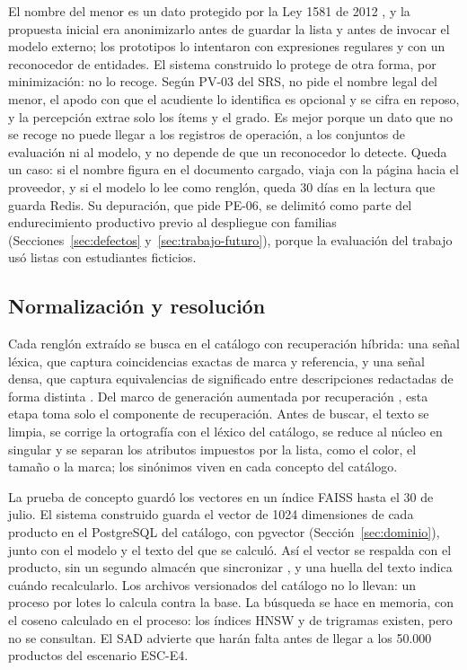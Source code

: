 El nombre del menor es un dato
protegido por la Ley 1581 de 2012 \citep{congreso_ley1581_2012}, y la propuesta inicial era
anonimizarlo antes de guardar la lista y antes de invocar el modelo externo; los prototipos lo
intentaron con expresiones regulares y con un reconocedor de entidades. El sistema construido lo
protege de otra forma, por minimización: no lo recoge. Según PV-03 del SRS, no pide el nombre legal del menor, el
apodo con que el acudiente lo identifica es opcional y se cifra en reposo, y la percepción extrae
solo los ítems y el grado. Es mejor porque un dato que no se recoge no puede llegar a los registros
de operación, a los conjuntos de evaluación ni al modelo, y no depende de que un reconocedor lo
detecte. Queda un caso: si el nombre figura en el documento cargado, viaja con la página hacia el
proveedor, y si el modelo lo lee como renglón, queda 30 días en la lectura que guarda Redis. Su
depuración, que pide PE-06, se delimitó como parte del endurecimiento productivo previo al
despliegue con familias (Secciones~\ref{sec:defectos} y~\ref{sec:trabajo-futuro}), porque la
evaluación del trabajo usó listas con estudiantes ficticios.

\subsection{Normalización y resolución}
\label{sec:normalizacion}

Cada renglón extraído se busca en el catálogo con recuperación híbrida: una señal léxica, que
captura coincidencias exactas de marca y referencia, y una señal densa, que captura equivalencias de
significado entre descripciones redactadas de forma distinta
\citep{reimers_sentence-bert_2019,karpukhin_dense_2020}. Del marco de generación aumentada por
recuperación \citep{lewis_retrieval-augmented_2020}, esta etapa toma solo el componente de
recuperación. Antes de buscar, el texto se limpia, se
corrige la ortografía con el léxico del catálogo, se reduce al núcleo en singular y se separan los
atributos impuestos por la lista, como el color, el tamaño o la marca; los sinónimos viven en cada
concepto del catálogo.

La
prueba de concepto guardó los vectores en un índice FAISS \citep{johnson_billion-scale_2021} hasta
el 30 de julio. El sistema construido guarda el vector de 1024 dimensiones de cada producto en el
PostgreSQL del catálogo, con pgvector (Sección~\ref{sec:dominio}), junto con el modelo y el texto
del que se calculó. Así el vector se respalda con el producto, sin un segundo almacén
que sincronizar \citep{kleppmann_designing_2017}, y una huella del texto indica cuándo recalcularlo.
Los archivos versionados del catálogo no lo llevan: un proceso por lotes lo calcula contra la base.
La búsqueda se hace en memoria, con el coseno calculado en el proceso: los índices HNSW y de
trigramas existen, pero no se consultan. El SAD advierte que harán falta antes de llegar a los
50.000 productos del escenario ESC-E4.

